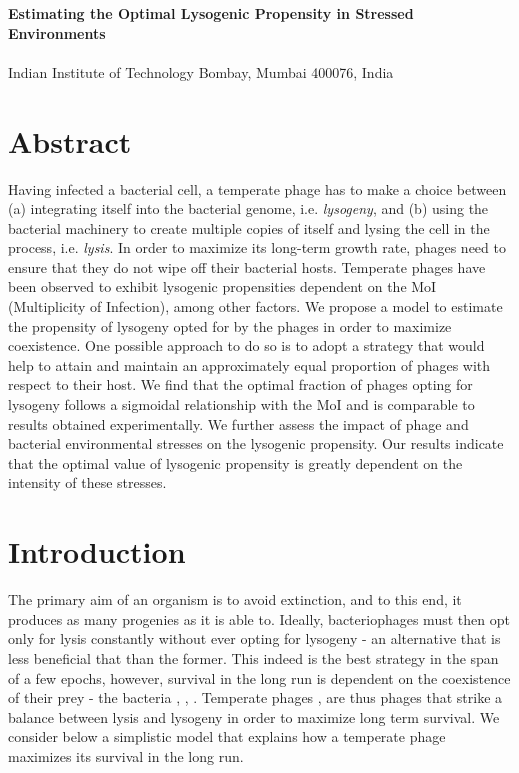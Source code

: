 \documentclass[12pt,letterpaper]{article}
\begin{document}
\vspace*{0.35in}

{\Large
\textbf{\newline Estimating the Optimal Lysogenic Propensity in Stressed Environments}
}
\newline
\\
\vspace{1mm}
\\
\noindent Indian Institute of Technology Bombay, Mumbai 400076, India
\\

\section*{Abstract}
\par Having infected a bacterial cell, a temperate phage has to make a choice between (a) integrating itself into the bacterial genome, i.e. \textit{lysogeny}, and (b) using the bacterial machinery to create multiple copies of itself and lysing the cell in the process, i.e. \textit{lysis}. In order to maximize its long-term growth rate, phages need to ensure that they do not wipe off their bacterial hosts. Temperate phages have been observed to exhibit lysogenic propensities dependent on the MoI (Multiplicity of Infection), among other factors. We propose a model to estimate the propensity of lysogeny opted for by the phages in order to maximize coexistence. One possible approach to do so is to adopt a strategy that would help to attain and maintain an approximately equal proportion of phages with respect to their host. We find that the optimal fraction of phages opting for lysogeny follows a sigmoidal relationship with the MoI and is comparable to results obtained experimentally. We further assess the impact of phage and bacterial environmental stresses on the lysogenic propensity. Our results indicate that the optimal value of lysogenic propensity is greatly dependent on the  intensity of these stresses.

\linenumbers

\section*{Introduction}
The primary aim of an organism is to avoid extinction, and to this end, it produces as many progenies as it is able to. Ideally, bacteriophages must then opt only for lysis constantly without ever opting for lysogeny - an alternative that is less beneficial that than the former. This indeed is the best strategy in the span of a few epochs, however, survival in the long run is dependent on the coexistence of their prey - the bacteria \cite{de2006viruses}, \cite{weitz2005coevolutionary}, \cite{echols1972developmental}. Temperate phages \cite{stewart1984population}, \cite{maslov2015well} are thus phages that strike a balance between lysis and lysogeny in order to maximize long term survival. We consider below a simplistic model that explains how a temperate phage maximizes its survival in the long run.
\end{document}
